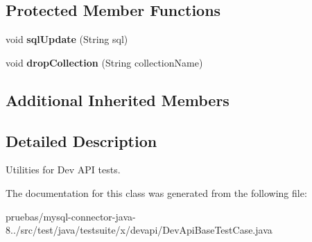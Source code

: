 \subsection*{Protected Member Functions}
\begin{DoxyCompactItemize}
\item 
\mbox{\label{classtestsuite_1_1x_1_1devapi_1_1_dev_api_base_test_case_a741b5c92e758ee530cdbab2fb77dce54}} 
void {\bfseries sql\+Update} (String sql)
\item 
\mbox{\label{classtestsuite_1_1x_1_1devapi_1_1_dev_api_base_test_case_a43f5fcbf2c94ba6d3ee1604c96c4ef02}} 
void {\bfseries drop\+Collection} (String collection\+Name)
\end{DoxyCompactItemize}
\subsection*{Additional Inherited Members}


\subsection{Detailed Description}
Utilities for Dev A\+PI tests. 

The documentation for this class was generated from the following file\+:\begin{DoxyCompactItemize}
\item 
pruebas/mysql-\/connector-\/java-\/8../src/test/java/testsuite/x/devapi/Dev\+Api\+Base\+Test\+Case.\+java\end{DoxyCompactItemize}
